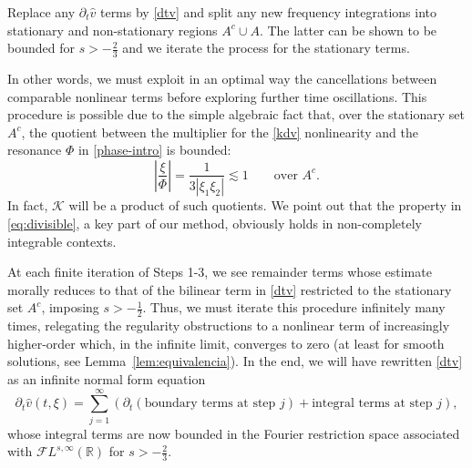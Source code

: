 \documentclass[a4paper,
11pt,  reqno]{amsart}
\newcommand{\5}{\textup{V}}
\newcommand{\noi}{\noindent}
\newcommand{\ft}{\widehat}
\newcommand{\dt}{\partial_t}
\theoremstyle{remark}
\newcommand{\R}{\mathbb{R}}
\numberwithin{equation}{section}
\numberwithin{theorem}{section}
\begin{document}
    \smallskip
\noi{\bf Step 3.}  
Replace any $\dt \ft{v}$ terms by \eqref{dtv} and split any new frequency integrations into stationary and non-stationary regions $A^c \cup A$. The latter can be shown to be bounded for $s>-\frac23$ and we iterate the process for the stationary terms.
    
    \medskip

    In other words, we must exploit in an optimal way the cancellations between comparable nonlinear terms before exploring further time oscillations. This procedure is possible due to the simple algebraic fact that, over the stationary set $A^c$, the quotient between the multiplier for the \eqref{kdv} nonlinearity and the resonance $\Phi$ in \eqref{phase-intro} is bounded:
\begin{equation}\label{eq:divisible}
		\left|\frac{\xi}{\Phi}\right|=\frac{1}{3|\xi_1\xi_2|}\lesssim 1\qquad \mbox{over }A^c.
\end{equation}
In fact, $\mathcal{K}$ will be a product of such quotients.
		We point out that the property in \eqref{eq:divisible}, a key part of our method, obviously holds in non-completely integrable contexts.


    \medskip


At each finite iteration of Steps 1-3, we see remainder terms whose estimate morally reduces to that of the bilinear term in \eqref{dtv} restricted to the stationary set $A^c$,  imposing $s>-\frac12$. Thus, we must iterate this procedure infinitely many times,  relegating the regularity obstructions to a nonlinear term of increasingly higher-order which, in the infinite limit, converges to zero (at least for smooth solutions, see Lemma~\ref{lem:equivalencia}).
    In the end, we will have rewritten \eqref{dtv} as an infinite normal form equation
\begin{equation}\label{eq:nfe_intro}
		\dt\widehat{v}(t,\xi)=  \sum_{j=1}^\infty \left(\dt\left(\mbox{boundary terms at step } j\right)+ \mbox{integral terms at step }j\right),
	\end{equation}
	whose integral terms are now bounded in the Fourier restriction space associated with $\mathcal{F}L^{s,\infty}(\R)$ for $s>-\frac23$. 
\end{document}
